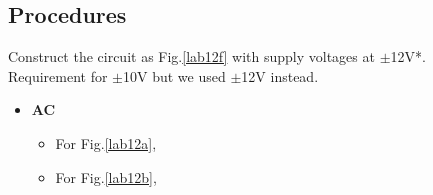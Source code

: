     \subsection{Procedures}
    Construct the circuit as Fig.\ref{lab12f} with supply voltages at $\pm$12V*.\\
    {\small *Requirement for $\pm$10V but we used $\pm$12V instead.}\\
        \begin{itemize}
            \item \textbf{AC}
                \begin{itemize}
                    \item For Fig.\ref{lab12a},\\
                    \item For Fig.\ref{lab12b},\\
                \end{itemize}


\end{itemize}
